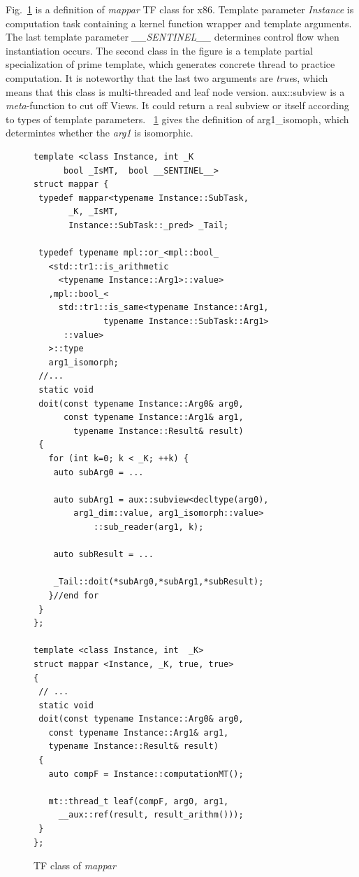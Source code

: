 \documentclass[10pt, conference, compsocconf]{IEEEtran}
\begin{document}
Fig.~\ref{lst:mappar} is a definition of \emph{mappar} TF
class for x86. Template parameter \emph{Instance} is computation task
containing a kernel function wrapper and template arguments. The last template
parameter \emph{\_\_SENTINEL\_\_} determines control flow when
instantiation occurs. The second class in the figure is a template partial
specialization of prime template, which generates concrete thread
to practice computation. It is noteworthy that the last two arguments
are \emph{true}s, which means that this class is multi-threaded and
leaf node version. aux::subview is a \emph{meta}-function to cut off
Views. It could return a real subview or itself according to types of template
parameters. ~\ref{lst:mappar} gives the definition of arg1\_isomoph,
which determintes whether the \textit{arg1} is isomorphic.

\begin{figure}[!htp]
\begin{minipage}[tb]{\linewidth}
\makebox[\textwidth]{\hrulefill}
\begin{small}
\begin{verbatim}
template <class Instance, int _K
	  bool _IsMT,  bool __SENTINEL__>
struct mappar {
 typedef mappar<typename Instance::SubTask, 
       _K, _IsMT, 
       Instance::SubTask::_pred> _Tail;

 typedef typename mpl::or_<mpl::bool_
   <std::tr1::is_arithmetic
     <typename Instance::Arg1>::value>
   ,mpl::bool_<
     std::tr1::is_same<typename Instance::Arg1, 
              typename Instance::SubTask::Arg1>
      ::value>
   >::type
   arg1_isomorph;
 //...
 static void 
 doit(const typename Instance::Arg0& arg0, 
      const typename Instance::Arg1& arg1, 
        typename Instance::Result& result)
 {
   for (int k=0; k < _K; ++k) {
    auto subArg0 = ...
 
    auto subArg1 = aux::subview<decltype(arg0), 
        arg1_dim::value, arg1_isomorph::value>
            ::sub_reader(arg1, k); 
	  
    auto subResult = ...

    _Tail::doit(*subArg0,*subArg1,*subResult);
   }//end for
 }
};

template <class Instance, int  _K>
struct mappar <Instance, _K, true, true> 
{
 // ...
 static void 
 doit(const typename Instance::Arg0& arg0, 
   const typename Instance::Arg1& arg1,
   typename Instance::Result& result)
 {
   auto compF = Instance::computationMT();

   mt::thread_t leaf(compF, arg0, arg1, 
     __aux::ref(result, result_arithm()));
 }
};

\end{verbatim}
\end{small}
\vspace{-1ex}\makebox[\textwidth]{\hrulefill}
\end{minipage}
\caption{TF class of \textsl{mappar}}\label{lst:mappar}
\end{figure}
\end{document}
